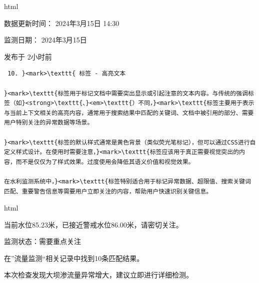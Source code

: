 html

数据更新时间： 2024年3月15日 14:30

监测日期： 2024年3月15日

发布于 2小时前

\begin{lstlisting}
 10. }<mark>\texttt{ 标签 - 高亮文本

}<mark>\texttt{标签用于标记文档中需要突出显示或引起注意的文本内容。与传统的强调标签（如}<strong>\texttt{、}<em>\texttt{）不同，}<mark>\texttt{标签主要用于表示与当前上下文相关的高亮内容，通常用于搜索结果中匹配的关键词、文档中被引用的部分、需要用户特别关注的异常数据等场景。

}<mark>\texttt{标签的默认样式通常是黄色背景（类似荧光笔标记），但可以通过CSS进行自定义样式设计。在使用时需要注意，}<mark>\texttt{标签应该用于真正需要视觉突出的内容，而不是仅仅为了样式效果。过度使用会降低其语义价值和视觉效果。

在水利监测系统中，}<mark>\texttt{标签特别适合用于标记异常数据、超限值、搜索关键词匹配、重要警告信息等需要用户立即关注的内容，帮助用户快速识别关键信息。
\end{lstlisting}

html

当前水位85.23米，已接近警戒水位86.00米，请密切关注。

监测状态：需要重点关注

在''流量监测``相关记录中找到10条匹配结果。

本次检查发现大坝渗流量异常增大，建议立即进行详细检测。

